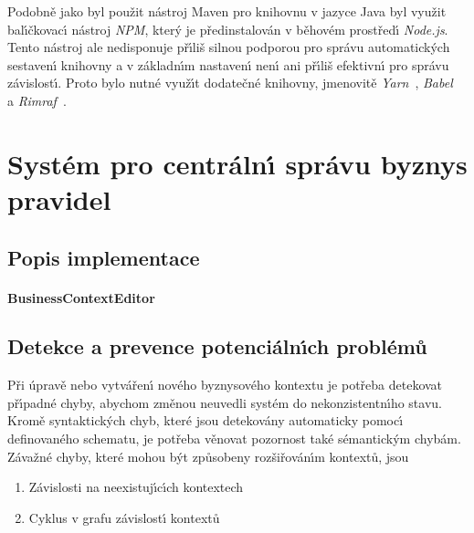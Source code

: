 Podobně jako byl použit nástroj Maven pro knihovnu v jazyce Java byl
využit bal\'{\i}čkovac\'{\i} nástroj \textit{NPM}, kter\'y je předinstalován
v běhovém prostřed\'{\i} \textit{Node.js}. Tento nástroj ale nedisponuje
př\'{\i}liš silnou podporou pro správu automatick\'ych sestaven\'{\i} knihovny
a v základn\'{\i}m nastaven\'{\i} nen\'{\i} ani př\'{\i}liš efektivn\'{\i} pro správu závislost\'{\i}.
Proto bylo nutné využ\'{\i}t dodatečné knihovny, jmenovitě
\textit{Yarn}~\cite{yarnpkg}, \textit{Babel}~\cite{babel} a
\textit{Rimraf}~\cite{rimraf}.

\section{Systém pro centráln\'{\i} správu byznys pravidel}\label{sec:central-administration}



\subsection{Popis implementace}

\paragraph{BusinessContextEditor} %

\subsection{Detekce a prevence potenciáln\'{\i}ch problémů}

Při úpravě nebo vytvářen\'{\i} nového byznysového kontextu je
potřeba detekovat př\'{\i}padné chyby, abychom změnou neuvedli
systém do nekonzistentn\'{\i}ho stavu. Kromě syntaktick\'ych chyb,
které jsou detekovány automaticky pomoc\'{\i} definovaného schematu,
je potřeba věnovat pozornost také sémantick\'ym chybám.
Závažné chyby, které mohou b\'yt způsobeny rozšiřován\'{\i}m kontextů, jsou
\begin{enumerate}[label=\alph*)]
    \item Závislosti na neexistuj\'{\i}c\'{\i}ch kontextech
    \item Cyklus v grafu závislost\'{\i} kontextů
\end{enumerate}

